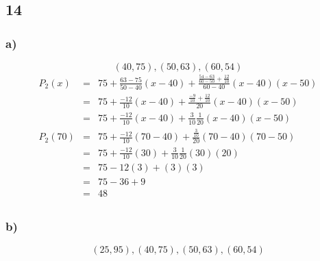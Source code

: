 \documentclass[12pt]{article}
\begin{document}
\subsection*{14}
\subsubsection*{a)}
\[(40,75), (50,63), (60,54)\]
\begin{eqnarray*}
  P_2(x) & = & 75 + \frac{63-75}{50-40}(x-40) + \frac{\frac{54-63}{60-50} + \frac{12}{10}}{60-40}(x-40)(x-50)\\
  & = & 75 + \frac{-12}{10}(x-40) + \frac{\frac{-9}{10} + \frac{12}{10}}{20}(x-40)(x-50)\\
  & = & 75 + \frac{-12}{10}(x-40) + \frac{3}{10}\frac{1}{20}(x-40)(x-50)\\
  P_2(70) & = & 75 + \frac{-12}{10}(70-40) + \frac{\frac{3}{10}}{20}(70-40)(70-50)\\
  & = & 75 + \frac{-12}{10}(30) + \frac{3}{10}\frac{1}{20}(30)(20)\\
  & = & 75 -12(3) + (3)(3)\\
  & = & 75 -36 + 9\\
  & = & 48\\
\end{eqnarray*}

\subsubsection*{b)}
\[(25,95), (40,75), (50,63), (60,54)\]
\end{document}
